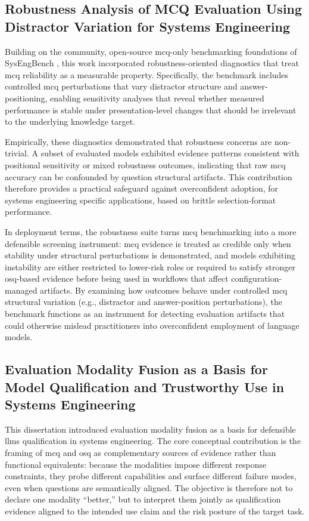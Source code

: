 \subsection{Robustness Analysis of MCQ Evaluation Using Distractor Variation for Systems Engineering}\label{subsec:ch6_contrib2}

Building on the community, open-source \ac{mcq}-only benchmarking foundations of SysEngBench \cite{bell_IntroducingSysEngBenchNovel_2024, Bell2025SysEngBench}, this work incorporated robustness-oriented diagnostics that treat \ac{mcq} reliability as a measurable property. Specifically, the benchmark includes controlled \ac{mcq} perturbations that vary distractor structure and answer-positioning, enabling sensitivity analyses that reveal whether measured performance is stable under presentation-level changes that should be irrelevant to the underlying knowledge target.

Empirically, these diagnostics demonstrated that robustness concerns are non-trivial. A subset of evaluated models exhibited evidence patterns consistent with positional sensitivity or mixed robustness outcomes, indicating that raw \ac{mcq} accuracy can be confounded by question structural artifacts. This contribution therefore provides a practical safeguard against overconfident adoption, for systems engineering specific applications, based on brittle selection-format performance.

In deployment terms, the robustness suite turns \ac{mcq} benchmarking into a more defensible screening instrument: \ac{mcq} evidence is treated as credible only when stability under structural perturbations is demonstrated, and models exhibiting instability are either restricted to lower-risk roles or required to satisfy stronger \ac{osq}-based evidence before being used in workflows that affect configuration-managed artifacts. By examining how outcomes behave under controlled \ac{mcq} structural variation (e.g., distractor and answer-position perturbations), the benchmark functions as an instrument for detecting evaluation artifacts that could otherwise mislead practitioners into overconfident employment of language models.

\subsection{Evaluation Modality Fusion as a Basis for Model Qualification and Trustworthy Use in Systems Engineering}\label{subsec:ch6_contrib3}

This dissertation introduced evaluation modality fusion as a basis for defensible \acp{llm} qualification in systems engineering. The core conceptual contribution is the framing of \ac{mcq} and \ac{osq} as complementary sources of evidence rather than functional equivalents: because the modalities impose different response constraints, they probe different capabilities and surface different failure modes, even when questions are semantically aligned. The objective is therefore not to declare one modality ``better,'' but to interpret them jointly as qualification evidence aligned to the intended use claim and the risk posture of the target task.

